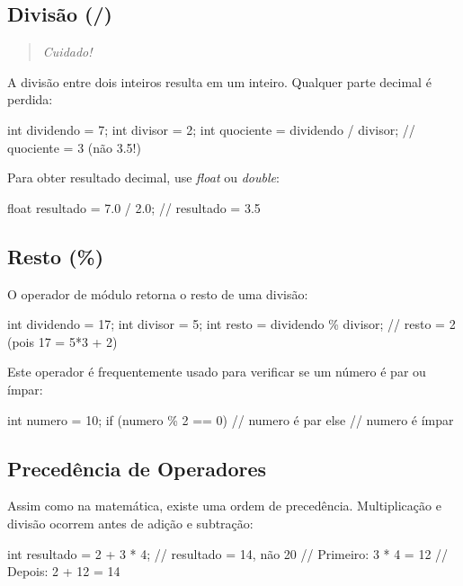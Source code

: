 \subsection{Divisão (/)}

\begin{quote}
\textit{Cuidado!}
\end{quote}

A divisão entre dois inteiros resulta em um inteiro. Qualquer parte decimal é perdida:

\begin{ccode}
  int dividendo = 7;
  int divisor = 2;
  int quociente = dividendo / divisor;  // quociente = 3 (não 3.5!)
\end{ccode}

Para obter resultado decimal, use \textit{float} ou \textit{double}:

\begin{ccode}
  float resultado = 7.0 / 2.0;  // resultado = 3.5
\end{ccode}

\subsection{Resto (\%)}

O operador de módulo retorna o resto de uma divisão:

\begin{ccode}
  int dividendo = 17;
  int divisor = 5;
  int resto = dividendo \% divisor;  // resto = 2 (pois 17 = 5*3 + 2)
\end{ccode}

Este operador é frequentemente usado para verificar se um número é par ou ímpar:

\begin{ccode}
  int numero = 10;
  if (numero \% 2 == 0) {
    // numero é par
  } else {
    // numero é ímpar
  }
\end{ccode}

\subsection{Precedência de Operadores}

Assim como na matemática, existe uma ordem de precedência. Multiplicação e divisão ocorrem antes de adição e subtração:

\begin{ccode}
  int resultado = 2 + 3 * 4;  // resultado = 14, não 20
  // Primeiro: 3 * 4 = 12
  // Depois: 2 + 12 = 14
\end{ccode}

